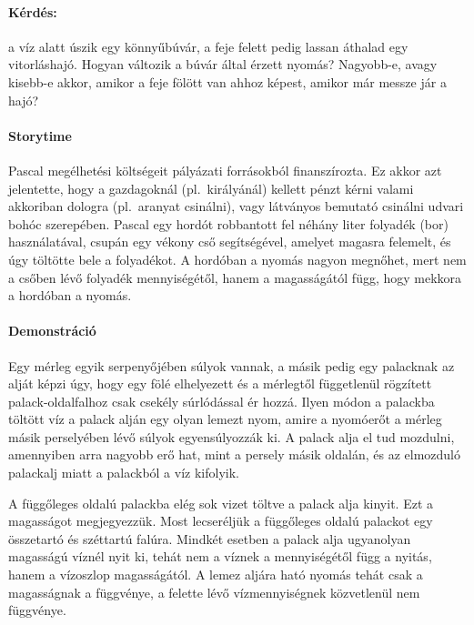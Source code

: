 \documentclass[12pt,a4paper]{scrartcl}
\begin{document}
\paragraph{Kérdés:} a víz alatt úszik egy könnyűbúvár, a feje felett pedig lassan áthalad egy vitorláshajó. Hogyan változik a búvár által érzett nyomás? Nagyobb-e, avagy kisebb-e akkor, amikor a feje fölött van ahhoz képest, amikor már messze jár a hajó?

\paragraph{Storytime} Pascal megélhetési költségeit pályázati forrásokból finanszírozta. Ez akkor azt jelentette, hogy a gazdagoknál (pl.\ királyánál) kellett pénzt kérni valami akkoriban dologra (pl.\ aranyat csinálni), vagy látványos bemutató csinálni udvari bohóc szerepében. Pascal egy hordót robbantott fel néhány liter folyadék (bor) használatával, csupán egy vékony cső segítségével, amelyet magasra felemelt, és úgy töltötte bele a folyadékot. A hordóban a nyomás nagyon megnőhet, mert nem a csőben lévő folyadék mennyiségétől, hanem a magasságától függ, hogy mekkora a hordóban a nyomás.

\paragraph{Demonstráció} Egy mérleg egyik serpenyőjében súlyok vannak, a másik pedig egy palacknak az alját képzi úgy, hogy egy fölé elhelyezett és a mérlegtől függetlenül rögzített palack-oldalfalhoz csak csekély súrlódással ér hozzá. Ilyen módon a palackba töltött víz a palack alján egy olyan lemezt nyom, amire a nyomóerőt a mérleg másik perselyében lévő súlyok egyensúlyozzák ki. A palack alja el tud mozdulni, amennyiben arra nagyobb erő hat, mint a persely másik oldalán, és az elmozduló palackalj miatt a palackból a víz kifolyik.

A függőleges oldalú palackba elég sok vizet töltve a palack alja kinyit. Ezt a magasságot megjegyezzük. Most lecseréljük a függőleges oldalú palackot egy összetartó és széttartú falúra. Mindkét esetben a palack alja ugyanolyan magasságú víznél nyit ki, tehát nem a víznek a mennyiségétől függ a nyitás, hanem a vízoszlop magasságától. A lemez aljára ható nyomás tehát csak a magasságnak a függvénye, a felette lévő vízmennyiségnek közvetlenül nem függvénye.
\normalsize
\end{document}

